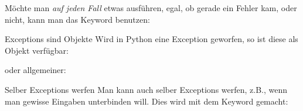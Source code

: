 \begin{frame}{}
	Möchte man \textit{auf jeden Fall} etwas ausführen, egal, ob gerade ein Fehler kam, oder nicht, kann man das Keyword  benutzen:
	
\end{frame}

\begin{frame}{Exceptions sind Objekte}
	Wird in Python eine Exception geworfen, so ist diese als Objekt verfügbar:
	
	oder allgemeiner:
	
\end{frame}

\begin{frame}{Selber Exceptions werfen}
	Man kann auch selber Exceptions werfen, z.B., wenn man gewisse Eingaben unterbinden will. Dies wird mit dem Keyword  gemacht:
	
\end{frame}


